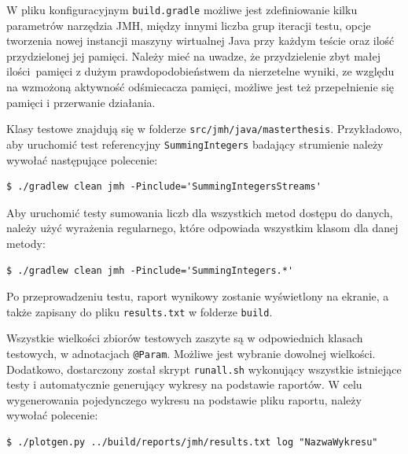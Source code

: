 \documentclass[12pt,twoside,openright]{extarticle}
\begin{document}
    W pliku konfiguracyjnym \texttt{build.gradle} możliwe jest zdefiniowanie kilku parametrów narzędzia JMH, między innymi liczba grup iteracji testu, opcje tworzenia nowej instancji maszyny wirtualnej Java przy każdym teście oraz ilość przydzielonej jej pamięci. Należy mieć na uwadze, że przydzielenie zbyt małej ilości pamięci z dużym prawdopodobieństwem da nierzetelne wyniki, ze względu na wzmożoną aktywność odśmiecacza pamięci, możliwe jest też przepełnienie się pamięci i przerwanie działania. 

    Klasy testowe znajdują się w folderze \texttt{src/jmh/java/masterthesis}. Przykładowo, aby uruchomić test referencyjny \texttt{SummingIntegers} badający strumienie należy wywołać następujące polecenie:

\begin{verbatim}
$ ./gradlew clean jmh -Pinclude='SummingIntegersStreams'
\end{verbatim}

    Aby uruchomić testy sumowania liczb dla wszystkich metod dostępu do danych, należy użyć wyrażenia regularnego, które odpowiada wszystkim klasom dla danej metody:

\begin{verbatim}
$ ./gradlew clean jmh -Pinclude='SummingIntegers.*'
\end{verbatim}

    Po przeprowadzeniu testu, raport wynikowy zostanie wyświetlony na ekranie, a także zapisany do pliku \texttt{results.txt} w folderze \texttt{build}.

    Wszystkie wielkości zbiorów testowych zaszyte są w odpowiednich klasach testowych, w adnotacjach \texttt{@Param}. Możliwe jest wybranie dowolnej wielkości. Dodatkowo, dostarczony został skrypt \texttt{runall.sh} wykonujący wszystkie istniejące testy i automatycznie generujący wykresy na podstawie raportów. W celu wygenerowania pojedynczego wykresu na podstawie pliku raportu, należy wywołać polecenie:

\begin{verbatim}
$ ./plotgen.py ../build/reports/jmh/results.txt log "NazwaWykresu"
\end{verbatim}
\end{document}
